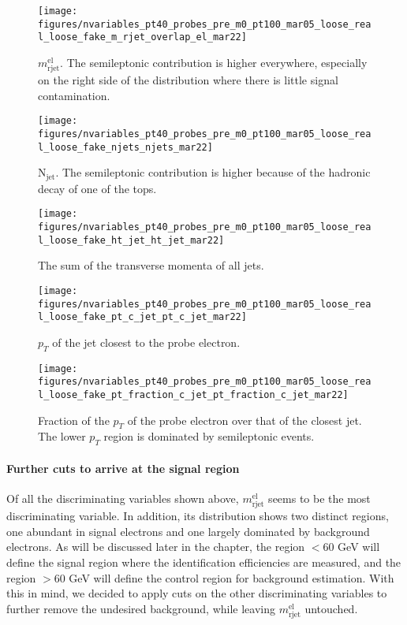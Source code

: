 \begin{figure}[H]
	\texttt{[image: figures/nvariables\_pt40\_probes\_pre\_m0\_pt100\_mar05\_loose\_real\_loose\_fake\_m\_rjet\_overlap\_el\_mar22]}
	\centering
	\caption{$m_{\text{rjet}}^{\text{el}}$. The semileptonic contribution is higher everywhere, especially on the right side of the distribution where
		there is little signal contamination.}
	\label{f:premrjet}
\end{figure}

\begin{figure}[H]
	\texttt{[image: figures/nvariables\_pt40\_probes\_pre\_m0\_pt100\_mar05\_loose\_real\_loose\_fake\_njets\_njets\_mar22]}
	\centering
	\caption{$\text{N}_{\text{jet}}$. The semileptonic contribution is higher because of the hadronic decay of one of the tops.}
	\label{f:prenjets}
\end{figure}

\begin{figure}[H]
	\texttt{[image: figures/nvariables\_pt40\_probes\_pre\_m0\_pt100\_mar05\_loose\_real\_loose\_fake\_ht\_jet\_ht\_jet\_mar22]}
	\centering
	\caption{The sum of the transverse momenta of all jets.}
	\label{f:prehtjet}
\end{figure}


\begin{figure}[H]
	\texttt{[image: figures/nvariables\_pt40\_probes\_pre\_m0\_pt100\_mar05\_loose\_real\_loose\_fake\_pt\_c\_jet\_pt\_c\_jet\_mar22]}
	\centering
	\caption{$p_T$ of the jet closest to the probe electron. }
	\label{f:preptcjet}
\end{figure}


\begin{figure}[H]
	\texttt{[image: figures/nvariables\_pt40\_probes\_pre\_m0\_pt100\_mar05\_loose\_real\_loose\_fake\_pt\_fraction\_c\_jet\_pt\_fraction\_c\_jet\_mar22]}
	\centering
	\caption{Fraction of the $p_T$ of the probe electron over that of the closest jet. The lower $p_T$ region is dominated by semileptonic events.}
	\label{f:preptfractioncjet}
\end{figure}

\paragraph{Further cuts to arrive at the signal region}\label{p:eidfurthercuts}

Of all the discriminating variables shown above, $m_{\text{rjet}}^{\text{el}}$
seems to be the most discriminating variable. In addition, its distribution
shows two distinct regions, one abundant in signal electrons and one largely
dominated by background electrons. As will be discussed later in the chapter,
the region $< 60$ GeV will define the signal region where the identification
efficiencies are measured, and the region $> 60$ GeV will define the control
region for background estimation. With this in mind, we decided to apply cuts
on the other discriminating variables to further remove the undesired
background, while leaving $m_{\text{rjet}}^{\text{el}}$ untouched.

